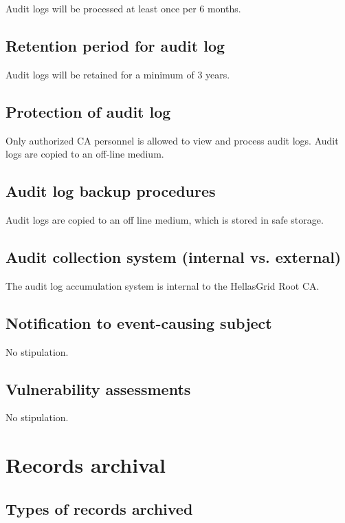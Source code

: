 \documentclass[11pt,a4paper,titlepage]{book}
\begin{document}
Audit logs will be processed at least once per 6 months.


\subsection{Retention period for audit log}

Audit logs will be retained for a minimum of 3 years.

\subsection{Protection of audit log}

Only authorized CA personnel is allowed to view and process audit logs. Audit logs are copied to an off-line medium.


\subsection{Audit log backup procedures}

Audit logs are copied to an off line medium, which is stored in safe storage.

\subsection{Audit collection system (internal vs. external)}

The audit log accumulation system is internal to the HellasGrid Root CA.

\subsection{Notification to event-causing subject}

No stipulation.

\subsection{Vulnerability assessments}

No stipulation.

\section{Records archival}
\subsection{Types of records archived}
\end{document}

